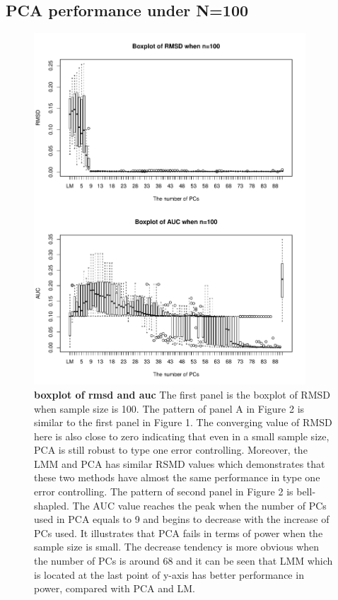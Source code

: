 \documentclass[12pt]{article}
\begin{document}
\subsection{PCA performance under N=100}
\begin{figure}[bp!]
  \centering
  \includegraphics[width=4in]{PCA_n_100_m_10_k_10.pdf}
  \caption{
    {\bf boxplot of rmsd and auc}
   The first panel is the boxplot of RMSD when sample size is 100. The pattern of panel A in Figure 2 is similar to the first panel in Figure 1. The converging value of RMSD here is also close to zero indicating that even in a small sample size, PCA is still robust to type one error controlling. Moreover, the LMM and PCA has similar RSMD values which demonstrates that these two methods have almost the same performance in type one error controlling. The pattern of second panel in Figure 2 is bell-shapled. The AUC value reaches the peak when the number of PCs used in PCA equals to 9 and begins to decrease with the increase of PCs used. It illustrates that PCA fails in terms of power when the sample size is small. The decrease tendency is more obvious when the number of PCs is around 68 and it can be seen that LMM which is located at the last point of y-axis has better performance in power, compared with PCA and LM.  }
  \label{fig:example}
\end{figure}
\end{document}
